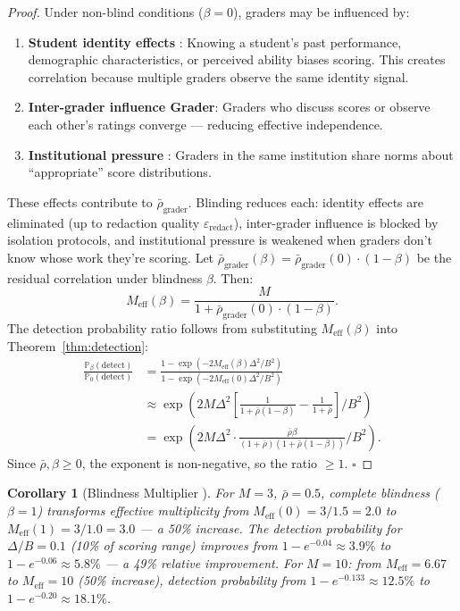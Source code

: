 \documentclass[11pt,a4paper]{article}
\newtheorem{corollary}[theorem]{Corollary}
\theoremstyle{definition}
\theoremstyle{remark}
\newcommand{\Pbb}{\mathbb{P}}
\begin{document}
\begin{proof}
Under non-blind conditions ($\beta=0$), graders may be influenced by:
\begin{enumerate}[label=(\roman*)]
    \item \textbf{Student identity effects }: Knowing a student's past performance, demographic characteristics, or perceived ability biases scoring. This creates correlation because multiple graders observe the same identity signal.
    \item \textbf{Inter-grader influence Grader}: Graders who discuss scores or observe each other's ratings converge — reducing effective independence.
    \item \textbf{Institutional pressure }: Graders in the same institution share norms about ``appropriate'' score distributions.
\end{enumerate}
These effects contribute to $\bar{\rho}_{\text{grader}}$. Blinding reduces each: identity effects are eliminated (up to redaction quality $\varepsilon_{\text{redact}}$), inter-grader influence is blocked by isolation protocols, and institutional pressure is weakened when graders don't know whose work they're scoring.
Let $\bar{\rho}_{\text{grader}}(\beta) = \bar{\rho}_{\text{grader}}(0) \cdot (1 - \beta)$ be the residual correlation under blindness $\beta$. Then:
\begin{equation}
    M_{\text{eff}}(\beta) = \frac{M}{1 + \bar{\rho}_{\text{grader}}(0) \cdot (1 - \beta)}.
\end{equation}
The detection probability ratio follows from substituting $M_{\text{eff}}(\beta)$ into Theorem~\ref{thm:detection}:
\begin{align}
    \frac{\Pbb_{\beta}(\text{detect})}{\Pbb_{0}(\text{detect})}
    &= \frac{1 - \exp(-2 M_{\text{eff}}(\beta) \Delta^2 / B^2)}{1 - \exp(-2 M_{\text{eff}}(0) \Delta^2 / B^2)} \\
    &\approx \exp\left(2 M \Delta^2 \left[\frac{1}{1 + \bar{\rho}(1-\beta)} - \frac{1}{1 + \bar{\rho}}\right] / B^2\right) \\
    &= \exp\left(2 M \Delta^2 \cdot \frac{\bar{\rho}\beta}{(1+\bar{\rho})(1+\bar{\rho}(1-\beta))} / B^2\right).
\end{align}
Since $\bar{\rho}, \beta \ge 0$, the exponent is non-negative, so the ratio $\ge 1$. \hfill $\square$
\end{proof}
\begin{corollary}[Blindness Multiplier ]
\label{cor:blindness_multiplier}
For $M=3$, $\bar{\rho}=0.5$, complete blindness ($\beta=1$) transforms effective multiplicity from $M_{\text{eff}}(0) = 3/1.5 = 2.0$ to $M_{\text{eff}}(1) = 3/1.0 = 3.0$ — a 50\% increase. The detection probability for $\Delta/B = 0.1$ (10\% of scoring range) improves from $1 - e^{-0.04} \approx 3.9\%$ to $1 - e^{-0.06} \approx 5.8\%$ — a 49\% relative improvement. For $M=10$: from $M_{\text{eff}}=6.67$ to $M_{\text{eff}}=10$ (50\% increase), detection probability from $1 - e^{-0.133} \approx 12.5\%$ to $1 - e^{-0.20} \approx 18.1\%$.
\end{corollary}
\end{document}
